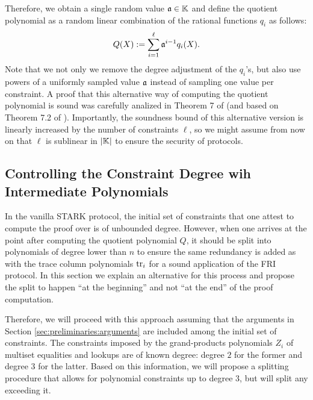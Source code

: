 Therefore, we obtain a single random value $\mathfrak{a} \in \mathbb{K}$ and define the quotient polynomial as a random linear combination of the rational functions $q_i$ as follows:
\[
  Q(X) := \sum_{i=1}^{\ell} \mathfrak{a}^{i-1} q_i(X).
\]
Note that we not only we remove the degree adjustment of the $q_i$'s, but also use powers of a uniformly sampled value $\mathfrak{a}$ instead of sampling one value per constraint. A proof that this alternative way of computing the quotient polynomial is sound was carefully analized in Theorem 7 of \cite{EPRINT:Habock22} (and based on Theorem 7.2 of \cite{EPRINT:BCIKS20}). Importantly, the soundness bound of this alternative version is linearly increased by the number of constraints $\ell$, so we might assume from now on that $\ell$ is sublinear in $|\mathbb{K}|$ to ensure the security of protocols.



\subsection{Controlling the Constraint Degree wih Intermediate Polynomials}\label{sec:controlling-degree}

In the vanilla STARK protocol, the initial set of constraints that one attest to compute the proof over is of unbounded degree. However, when one arrives at the point after computing the quotient polynomial $Q$, it should be split into polynomials of degree lower than $n$ to ensure the same redundancy is added as with the trace column polynomials $\text{tr}_i$ for a sound application of the FRI protocol. In this section we explain an alternative for this process and propose the split to happen ``at the beginning'' and not ``at the end'' of the proof computation. 

Therefore, we will proceed with this approach assuming that the arguments in Section \ref{sec:preliminaries:arguments} are included among the initial set of constraints. The constraints imposed by the grand-products polynomials $Z_i$ of multiset equalities and lookups are of known degree: degree $2$ for the former and degree $3$ for the latter. Based on this information, we will propose a splitting procedure that allows for polynomial constraints up to degree $3$, but will split any exceeding it.

